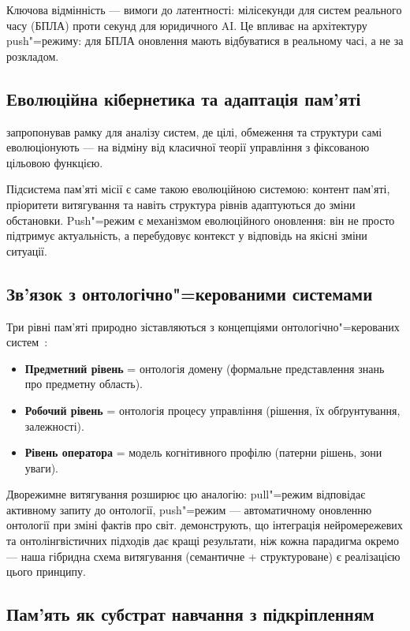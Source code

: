 \documentclass[11pt]{article}
\begin{document}
Ключова відмінність --- вимоги до латентності: мілісекунди для систем реального часу (БПЛА) проти секунд для юридичного AI.
Це впливає на архітектуру push"=режиму: для БПЛА оновлення мають відбуватися в реальному часі, а не за розкладом.

\subsection{Еволюційна кібернетика та адаптація пам'яті}

\citet{palagin2025evolutionary} запропонував рамку для аналізу систем, де цілі, обмеження та структури самі еволюціонують --- на відміну від класичної теорії управління з фіксованою цільовою функцією.

Підсистема пам'яті місії є саме такою еволюційною системою: контент пам'яті, пріоритети витягування та навіть структура рівнів адаптуються до зміни обстановки.
Push"=режим є механізмом еволюційного оновлення: він не просто підтримує актуальність, а перебудовує контекст у відповідь на якісні зміни ситуації.

\subsection{Зв'язок з онтологічно"=керованими системами}

Три рівні пам'яті природно зіставляються з концепціями онтологічно"=керованих систем~\citep{palagin2006architecture}:

\begin{itemize}[nosep]
  \item \textbf{Предметний рівень} = онтологія домену (формальне представлення знань про предметну область).
  \item \textbf{Робочий рівень} = онтологія процесу управління (рішення, їх обґрунтування, залежності).
  \item \textbf{Рівень оператора} = модель когнітивного профілю (патерни рішень, зони уваги).
\end{itemize}

Дворежимне витягування розширює цю аналогію: pull"=режим відповідає активному запиту до онтології, push"=режим --- автоматичному оновленню онтології при зміні фактів про світ.
\citet{palagin2024neural} демонструють, що інтеграція нейромережевих та онтолінгвістичних підходів дає кращі результати, ніж кожна парадигма окремо --- наша гібридна схема витягування (семантичне + структуроване) є реалізацією цього принципу.

\subsection{Пам'ять як субстрат навчання з підкріпленням}
\label{sec:disc-rlhf-substrate}
\end{document}
